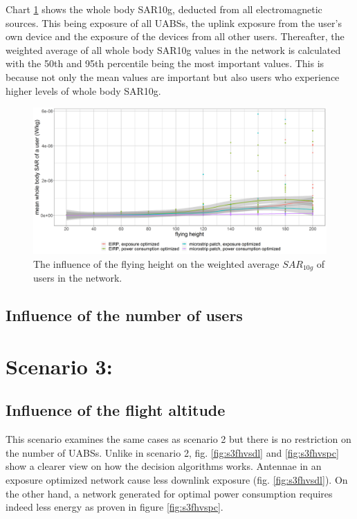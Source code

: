 Chart \ref{fig:s2fhvssar} shows the whole body SAR10g, deducted from all electromagnetic sources. This being exposure of all \gls{UABS}s,
 the uplink exposure from the user’s own device and the exposure of the devices from all other users. 
 Thereafter, the weighted average of all whole body SAR10g values in the network is calculated with the 50th and 95th percentile 
 being the most important values. This is because not only the mean values are important but also users who experience higher 
 levels of whole body SAR10g.


\begin{figure}[h!]
  \includegraphics[width=\textwidth]{../results/s2/fhvssar.png}
  \caption{The influence of the flying height on the weighted average $SAR_{10g}$ of users in the network.}
  \label{fig:s2fhvssar}
\end{figure}


\subsection{Influence of the number of users}


\newpage
\section{Scenario 3:}
\subsection{Influence of the flight altitude}

This scenario examines the same cases as scenario 2 but there is no restriction on the number of \gls{UABS}s. 
Unlike in scenario 2, fig. \ref{fig:s3fhvsdl} and \ref{fig:s3fhvspc} show a clearer view on how the decision algorithms
works. Antennae in an exposure optimized network cause less downlink exposure (fig. \ref{fig:s3fhvsdl}). On the other hand, 
a network generated for optimal power consumption requires indeed less energy as proven in figure \ref{fig:s3fhvspc}. 

